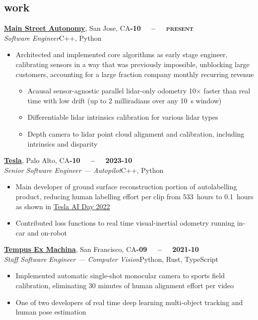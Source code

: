\documentclass[margin,10pt]{res}
\begin{document}
\begin{resume}
\section{\sc \lsstyle work}
    \href{https://mainstreetautonomy.com}{\textbf{Main Street Autonomy}}, San Jose, CA\hfill \textsc{\bfseries{}-10~~ -- ~~present}\\
    \textit{Software Engineer}\hfill C++, Python
    \vspace{0.5em}
    \begin{itemize}
        \item Architected and implemented core algorithms as early stage engineer, calibrating sensors in a way that was previously impossible, unblocking large customers, accounting for a large fraction company monthly recurring revenue
        \begin{itemize}
        \item Acausal sensor-agnostic parallel lidar-only odometry 10$\times$ faster than real time with low drift (up to 2 milliradians over any 10~s window)
        \item Differentiable lidar intrinsics calibration for various lidar types
        \item Depth camera to lidar point cloud alignment and calibration, including intrinsics and disparity
        \end{itemize}
    \end{itemize}
    
    \href{https://tesla.com/ai}{\textbf{Tesla}}, Palo Alto, CA\hfill \textsc{\bfseries{}-10~~ -- ~~2023-10}\\
    \textit{Senior Software Engineer --- Autopilot}\hfill C++, Python
    \vspace{0.5em}
    \begin{itemize}
        \item Main developer of ground surface reconstruction portion of autolabelling product, reducing human labelling effort per clip from 533~hours to 0.1~hours as shown in \href{https://youtu.be/ODSJsviD_SU?t=6034}{Tesla AI Day 2022}
        \item Contributed loss functions to real time visual-inertial odometry running in-car and on-robot
    \end{itemize}

    \href{https://tempus-ex.com}{\textbf{Tempus Ex Machina}}, San Francisco, CA\hfill \textsc{\bfseries{}-09~~ -- ~~2021-10}\\
    \textit{Staff Software Engineer --- Computer Vision}\hfill Python, Rust, TypeScript
    \vspace{0.5em}
    \begin{itemize}
        \item Implemented automatic single-shot monocular camera to sports field calibration, eliminating 30 minutes of human alignment effort per video
        \item One of two developers of real time deep learning multi-object tracking and human pose estimation
    \end{itemize}


\end{resume}
\end{document}

